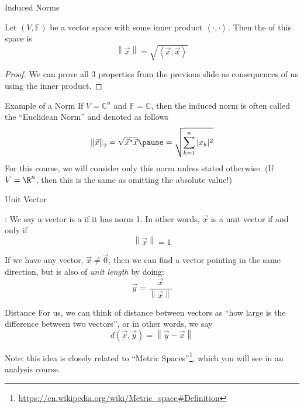\documentclass[xcoler=dvipsnames, aspectratio=169]{beamer}
\newcommand{\C}{\mathbb{C}}
\newcommand{\F}{\mathbb{F}}
\newcommand{\norm}[1]{\left\|#1\right\|}
\newcommand{\ip}[2]{\left\langle #1,#2\right\rangle}
\begin{document}
    \begin{frame}{Induced Norms}
        \begin{theorem}
            Let $(V,\F)$ be a vector space with some inner product $\ip{\cdot}{\cdot}$. Then the
             of this space is
            \[
                \norm{\vec{x}} = \sqrt{\ip{\vec{x}}{\vec{x}}}
            \]
        \end{theorem}\pause
        \begin{proof}
            We can prove all 3 properties from the previous slide as consequences of us using the
            inner product.
        \end{proof}
    \end{frame}
    \begin{frame}{Example of a Norm}
        If $V=\C^n$ and $\F=\C$, then the induced norm is often called the ``Euclidean Norm'' and
        denoted as follows\pause
        \[
            \norm{\vec{x}}_2 = \sqrt{\vec{x}^*\vec{x}}\pause = \sqrt{\sum_{k=1}^n|x_k|^2}
        \]\pause
        For this course, we will consider only this norm unless stated otherwise. (If $V=\R^n$, then
        this is the same as omitting the absolute value!)

    \end{frame}
    \begin{frame}{Unit Vector}
        \begin{defn}
            : We say a vector is a  if it has norm 1. In
            other words, $\vec{x}$ is a unit vector if and only if
            \[
                \norm{\vec{x}} = 1
            \]
        \end{defn}
        \pause
        If we have any vector, $\vec{x}\neq\vec{0}$, then we can find a vector pointing in the same
        direction, but is also of \emph{unit length} by doing:
        \[
            \vec{y} = \frac{\vec{x}}{\norm{\vec{x}}}
        \]
    \end{frame}
    \begin{frame}{Distance}
        For us, we can think of distance between vectors as ``how large is the difference between
        two vectors'', or in other words, we say
        \[
            d(\vec{x},\vec{y}) = \norm{\vec{y}-\vec{x}}
        \]

        Note: this idea is closely related to ``Metric Spaces''\footnote{\url{https://en.wikipedia.org/wiki/Metric\_space\#Definition}}, which you will see in an analysis course.
    \end{frame}
\end{document}
